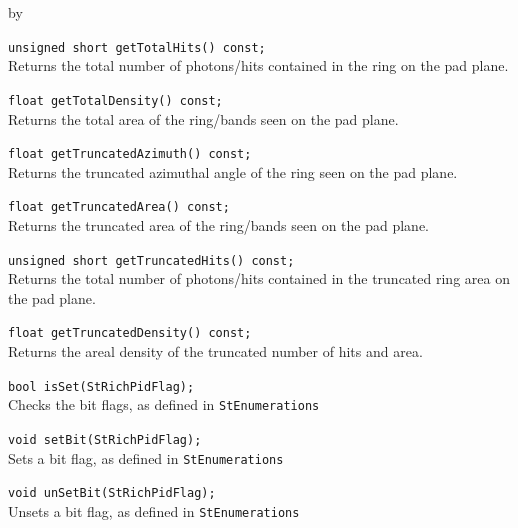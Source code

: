 \documentclass[twoside]{article}
\newcommand{\entrylabel}[1]{\mbox{\textbf{{#1}}}\hfil}%
\newenvironment{entry}
{\begin{list}{}%
    {\renewcommand{\makelabel}{\entrylabel}%
     \setlength{\labelwidth}{90pt}%
     \setlength{\leftmargin}{\labelwidth}
     \advance\leftmargin by \labelsep%
      }%
    }%
  {\end{list}}
\newcommand{\Entrylabel}[1]%
{\raisebox{0pt}[1ex][0pt]{\makebox[\labelwidth][l]%
    {\parbox[t]{\labelwidth}{\hspace{0pt}\textbf{{#1}}}}}}
\newenvironment{Entry}%
{\renewcommand{\entrylabel}{\Entrylabel}\begin{entry}}%
  {\end{entry}}
\begin{document}
\begin{Entry}
    \verb+unsigned short getTotalHits() const;+\\
    Returns the total number of photons/hits
    contained in the ring on the pad plane.
    
    \verb+float getTotalDensity() const;+\\
    Returns the total area of the ring/bands
    seen on the pad plane.

    \verb+float getTruncatedAzimuth() const;+\\
    Returns the truncated azimuthal angle of the ring
    seen on the pad plane.

    \verb+float getTruncatedArea() const;+\\
    Returns the truncated area of the ring/bands
    seen on the pad plane.

    \verb+unsigned short getTruncatedHits() const;+\\
    Returns the total number of photons/hits
    contained in the truncated ring area on
    the pad plane.

    \verb+float getTruncatedDensity() const;+\\
    Returns the areal density of the truncated
    number of hits and area.

    \verb+bool isSet(StRichPidFlag);+\\
    Checks the bit flags, as defined
    in \texttt{StEnumerations}
    
    \verb+void setBit(StRichPidFlag);+\\
    Sets a bit flag, as defined
    in \texttt{StEnumerations}
    
    \verb+void unSetBit(StRichPidFlag);+\\
    Unsets a bit flag, as defined
    in \texttt{StEnumerations}
    
\end{Entry}
\clearpage
\end{document}
